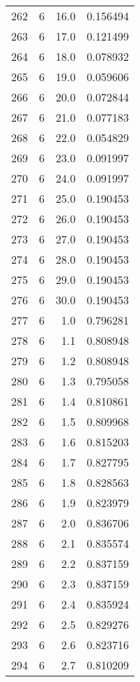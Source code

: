 \begin{tabular}{lrrr}
262 &        6 &     16.0 &  0.156494 \\
263 &        6 &     17.0 &  0.121499 \\
264 &        6 &     18.0 &  0.078932 \\
265 &        6 &     19.0 &  0.059606 \\
266 &        6 &     20.0 &  0.072844 \\
267 &        6 &     21.0 &  0.077183 \\
268 &        6 &     22.0 &  0.054829 \\
269 &        6 &     23.0 &  0.091997 \\
270 &        6 &     24.0 &  0.091997 \\
271 &        6 &     25.0 &  0.190453 \\
272 &        6 &     26.0 &  0.190453 \\
273 &        6 &     27.0 &  0.190453 \\
274 &        6 &     28.0 &  0.190453 \\
275 &        6 &     29.0 &  0.190453 \\
276 &        6 &     30.0 &  0.190453 \\
277 &        6 &      1.0 &  0.796281 \\
278 &        6 &      1.1 &  0.808948 \\
279 &        6 &      1.2 &  0.808948 \\
280 &        6 &      1.3 &  0.795058 \\
281 &        6 &      1.4 &  0.810861 \\
282 &        6 &      1.5 &  0.809968 \\
283 &        6 &      1.6 &  0.815203 \\
284 &        6 &      1.7 &  0.827795 \\
285 &        6 &      1.8 &  0.828563 \\
286 &        6 &      1.9 &  0.823979 \\
287 &        6 &      2.0 &  0.836706 \\
288 &        6 &      2.1 &  0.835574 \\
289 &        6 &      2.2 &  0.837159 \\
290 &        6 &      2.3 &  0.837159 \\
291 &        6 &      2.4 &  0.835924 \\
292 &        6 &      2.5 &  0.829276 \\
293 &        6 &      2.6 &  0.823716 \\
294 &        6 &      2.7 &  0.810209 \\

\end{tabular}
